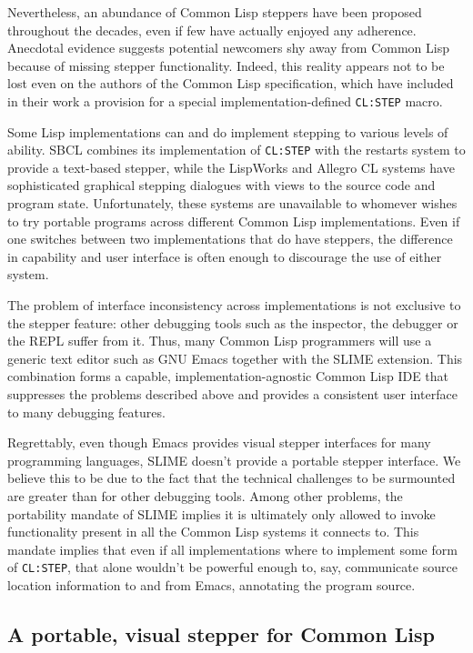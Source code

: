 \documentclass[sigconf]{acmart}
\begin{document}
Nevertheless, an abundance of Common Lisp steppers have been proposed
throughout the decades, even if few have actually enjoyed any
adherence.  Anecdotal evidence suggests potential newcomers shy away
from Common Lisp because of missing stepper functionality.  Indeed,
this reality appears not to be lost even on the authors of the Common
Lisp specification, which have included in their work a provision for
a special implementation-defined \texttt{CL:STEP} macro.

Some Lisp implementations can and do implement stepping to various
levels of ability.  SBCL combines its implementation of
\texttt{CL:STEP} with the restarts system to provide a text-based
stepper, while the LispWorks\cite{lispworks-stepper} and Allegro CL
systems have sophisticated graphical stepping dialogues with views to
the source code and program state.  Unfortunately, these systems are
unavailable to whomever wishes to try portable programs across
different Common Lisp implementations.  Even if one switches between
two implementations that do have steppers, the difference in
capability and user interface is often enough to discourage the use of
either system.

The problem of interface inconsistency across implementations is not
exclusive to the stepper feature: other debugging tools such as the
inspector, the debugger or the REPL suffer from it.  Thus, many Common
Lisp programmers will use a generic text editor such as GNU
Emacs\cite{emacs} together with the SLIME\cite{slime} extension.  This
combination forms a capable, implementation-agnostic Common Lisp IDE
that suppresses the problems described above and provides a consistent
user interface to many debugging features.

Regrettably, even though Emacs provides visual stepper interfaces for
many programming languages, SLIME doesn't provide a portable stepper
interface.  We believe this to be due to the fact that the technical
challenges to be surmounted are greater than for other debugging
tools.  Among other problems, the portability mandate of SLIME implies
it is ultimately only allowed to invoke functionality present in all
the Common Lisp systems it connects to.  This mandate implies that
even if all implementations where to implement some form of
\texttt{CL:STEP}, that alone wouldn't be powerful enough to, say,
communicate source location information to and from Emacs, annotating
the program source.

\subsection{A portable, visual stepper for Common
  Lisp}
\end{document}
